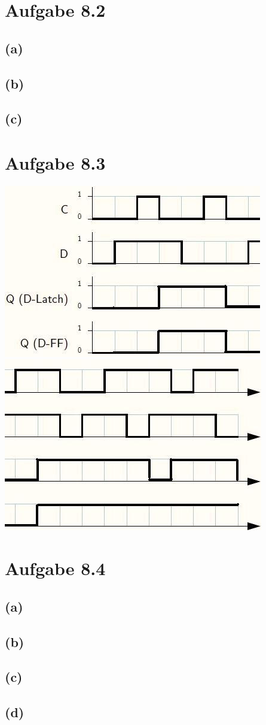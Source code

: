 \documentclass[12pt]{article}
\begin{document}
\section{Aufgabe 8.2}
\subsection{(a)}

\subsection{(b)}

\subsection{(c)}

\section{Aufgabe 8.3}
\includegraphics{Impulsdiagramm83a} \\
\includegraphics{Impulsdiagramm83b}

\section{Aufgabe 8.4}
\subsection{(a)}

\subsection{(b)}

\subsection{(c)}

\subsection{(d)}
\end{document}
